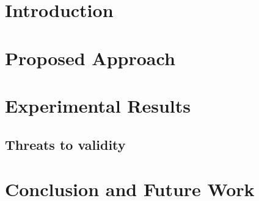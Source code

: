 	\author{
	}
	
	\maketitle	

	\begin{abstract}
		\label{sec:abstract}
		
	\end{abstract}


\section{Introduction}
\label{sec:introduction}


\section{Proposed Approach}
\label{sec:framework}


\section{Experimental Results}
\label{sec:exp_results}


\subsection{Threats to validity}
\label{sec:threats}



%

\section{Conclusion and Future Work}
\label{sec:conclusion}


%

%

\balance

\let\oldthebibliography=\thebibliography
\let\endoldthebibliography=\endthebibliography
{\scriptsize
	
	
}

